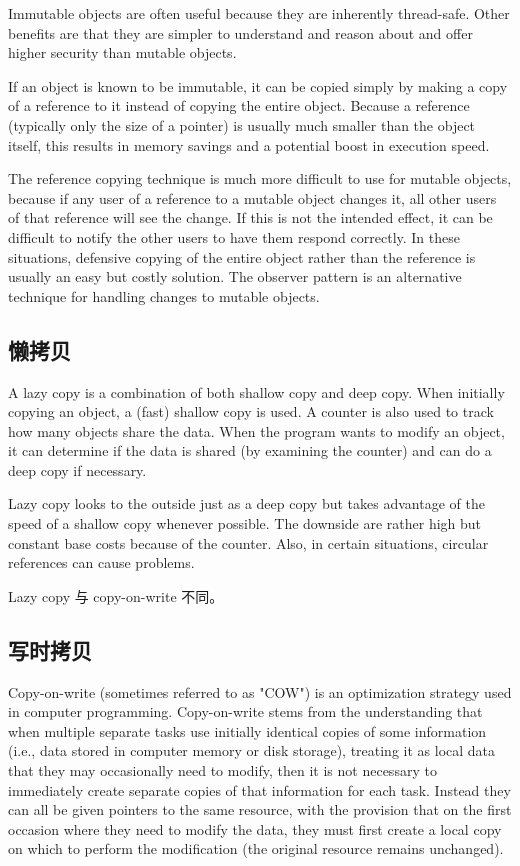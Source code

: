 Immutable objects are often useful because they are inherently thread-safe. Other benefits are that they are simpler to understand and reason about and offer higher security than mutable objects.

If an object is known to be immutable, it can be copied simply by making a copy of a reference to it instead of copying the entire object. Because a reference (typically only the size of a pointer) is usually much smaller than the object itself, this results in memory savings and a potential boost in execution speed.

The reference copying technique is much more difficult to use for mutable objects, because if any user of a reference to a mutable object changes it, all other users of that reference will see the change. If this is not the intended effect, it can be difficult to notify the other users to have them respond correctly. In these situations, defensive copying of the entire object rather than the reference is usually an easy but costly solution. The observer pattern is an alternative technique for handling changes to mutable objects.

\subsection{懒拷贝}
A lazy copy is a combination of both shallow copy and deep copy. When initially copying an object, a (fast) shallow copy is used. A counter is also used to track how many objects share the data. When the program wants to modify an object, it can determine if the data is shared (by examining the counter) and can do a deep copy if necessary.

Lazy copy looks to the outside just as a deep copy but takes advantage of the speed of a shallow copy whenever possible. The downside are rather high but constant base costs because of the counter. Also, in certain situations, circular references can cause problems.

Lazy copy 与 copy-on-write 不同。



\subsection{写时拷贝}
Copy-on-write (sometimes referred to as "COW") is an optimization strategy used in computer programming. Copy-on-write stems from the understanding that when multiple separate tasks use initially identical copies of some information (i.e., data stored in computer memory or disk storage), treating it as local data that they may occasionally need to modify, then it is not necessary to immediately create separate copies of that information for each task. Instead they can all be given pointers to the same resource, with the provision that on the first occasion where they need to modify the data, they must first create a local copy on which to perform the modification (the original resource remains unchanged).

